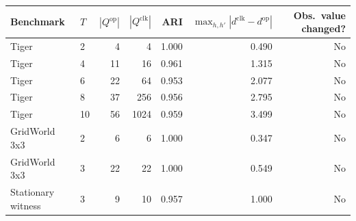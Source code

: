 \begin{tabular}{llrrrrr}
\toprule
Benchmark & $T$ & $|Q^{\mathrm{op}}|$ & $|Q^{\mathrm{clk}}|$ & ARI & $\max_{h,h'} |d^{\mathrm{clk}}-d^{\mathrm{op}}|$ & Obs.\ value changed?\\
\midrule
Tiger & 2 & 4 & 4 & 1.000 & 0.490 & No\\
Tiger & 4 & 11 & 16 & 0.961 & 1.315 & No\\
Tiger & 6 & 22 & 64 & 0.953 & 2.077 & No\\
Tiger & 8 & 37 & 256 & 0.956 & 2.795 & No\\
Tiger & 10 & 56 & 1024 & 0.959 & 3.499 & No\\
GridWorld 3x3 & 2 & 6 & 6 & 1.000 & 0.347 & No\\
GridWorld 3x3 & 3 & 22 & 22 & 1.000 & 0.549 & No\\
Stationary witness & 3 & 9 & 10 & 0.957 & 1.000 & No\\
\bottomrule
\end{tabular}